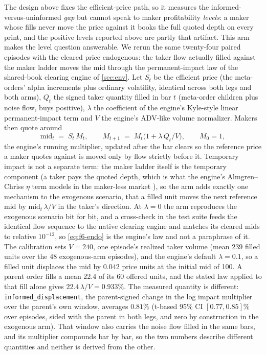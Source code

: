 The design above fixes the efficient-price path, so it measures the informed-versus-uninformed \emph{gap} but cannot speak to maker profitability \emph{levels}: a maker whose fills never move the price against it books the full quoted depth on every print, and the positive levels reported above are partly that artifact. This arm makes the level question answerable. We rerun the same twenty-four paired episodes with the cleared price endogenous: the taker flow actually filled against the maker ladder moves the mid through the permanent-impact law of the shared-book clearing engine of \cref{sec:env}. Let $S_t$ be the efficient price (the meta-orders' alpha increments plus ordinary volatility, identical across both legs and both arms), $Q_t$ the signed taker quantity filled in bar $t$ (meta-order children plus noise flow, buys positive), $\lambda$ the coefficient of the engine's Kyle-style linear permanent-impact term \citep{kyle1985continuous} and $V$ the engine's ADV-like volume normalizer. Makers then quote around
\begin{equation}\label{eq:f6-endo}
\mathrm{mid}_t \;=\; S_t\, M_t,
\qquad
M_{t+1} \;=\; M_t \bigl(1 + \lambda\, Q_t / V\bigr),
\qquad
M_0 = 1,
\end{equation}
the engine's running multiplier, updated after the bar clears so the reference price a maker quotes against is moved only by flow strictly before it. Temporary impact is not a separate term: the maker ladder itself is the temporary component (a taker pays the quoted depth, which is what the engine's Almgren--Chriss $\eta$ term models in the maker-less market \citep{almgren2001optimal}), so the arm adds exactly one mechanism to the exogenous scenario, that a filled unit moves the next reference mid by $\mathrm{mid}_t\,\lambda/V$ in the taker's direction. At $\lambda = 0$ the arm reproduces the exogenous scenario bit for bit, and a cross-check in the test suite feeds the identical flow sequence to the native clearing engine and matches its cleared mids to relative $10^{-12}$, so \cref{eq:f6-endo} is the engine's law and not a paraphrase of it. The calibration sets $V = 240$, one episode's realized taker volume (mean 239 filled units over the 48 exogenous-arm episodes), and the engine's default $\lambda = 0.1$, so a filled unit displaces the mid by $0.042$ price units at the initial mid of 100. A parent order fills a mean 22.4 of its 60 offered units, and the stated law applied to that fill alone gives $22.4\,\lambda/V = 0.933\%$. The measured quantity is different: \texttt{informed\_displacement}, the parent-signed change in the log impact multiplier over the parent's own window, averages $0.81\%$ (t-based 95\% CI $[0.77, 0.85]\%$ over episodes, sided with the parent in both legs, and zero by construction in the exogenous arm). That window also carries the noise flow filled in the same bars, and its multiplier compounds bar by bar, so the two numbers describe different quantities and neither is derived from the other.

